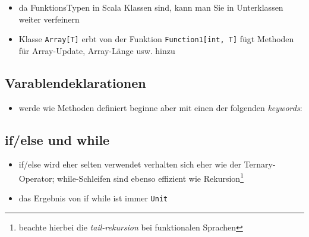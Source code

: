 

\begin{itemize}
  \item da FunktionsTypen in Scala Klassen sind, kann man Sie in Unterklassen
  weiter verfeinern
  \item Klasse \texttt{Array[T]} erbt von der Funktion \texttt{Function1[int, T]}
  \und fügt Methoden für Array-Update, Array-Länge usw. hinzu
  
  
\end{itemize}


\subsection{Varablendeklarationen}
\begin{itemize}
  \item werde wie Methoden definiert beginne aber mit einen der folgenden
  \textit{keywords}:
  

\end{itemize}


\subsection{if/else und while}
\begin{itemize}
  \item if/else wird eher selten verwendet \und verhalten sich eher wie
  der Ternary-Operator; while-Schleifen sind ebenso effizient wie 
  Rekursion\footnote{beachte hierbei die \textit{tail-rekursion} bei
  funktionalen Sprachen}
  
  
  
  \item das Ergebnis von if \und while ist immer \texttt{Unit}    
\end{itemize}


